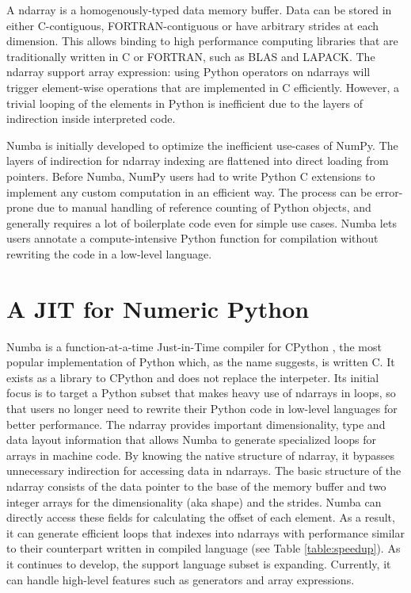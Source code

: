 \documentclass{acm_proc_article-sp}
\begin{document}
A ndarray is a homogenously-typed data memory buffer.  Data can be
stored in either C-contiguous, FORTRAN-contiguous or have arbitrary
strides at each dimension.  This allows binding to high performance
computing libraries that are traditionally written in C or FORTRAN,
such as BLAS and LAPACK. The ndarray support array expression: using
Python operators on ndarrays will trigger element-wise operations that
are implemented in C efficiently.  However, a trivial looping of the
elements in Python is inefficient due to the layers of indirection
inside interpreted code.

Numba \cite{numba:numba} is initially developed to optimize the inefficient
use-cases of NumPy.
The layers of indirection for ndarray indexing are flattened into direct
loading from pointers.  Before Numba, NumPy users had to write Python
C extensions to implement any custom computation in an efficient way.
The process can be error-prone due to manual handling of reference counting
of Python objects, and generally requires a lot of boilerplate code even
for simple use cases.  Numba lets users annotate a compute-intensive Python
function for compilation without rewriting the code in a low-level language.

\section{A JIT for Numeric Python}

Numba is a function-at-a-time Just-in-Time compiler for CPython
\cite{projectlink:cpython}, the most popular implementation of Python which,
as the name suggests, is written C.
It exists as a library to CPython and does not replace the interpeter.
Its initial focus is to target a Python subset that makes heavy use of
ndarrays in loops, so that users no longer need to rewrite their Python code in
low-level languages for better performance.
The ndarray provides important dimensionality, type and data layout information
that allows Numba to generate specialized  loops for arrays in machine code.
By knowing the native structure of ndarray,
it bypasses unnecessary indirection for accessing data in ndarrays.
The basic structure of the ndarray consists of the data pointer to the base of
the memory buffer and two integer arrays for the dimensionality (aka shape) and
the strides. Numba can directly access these fields for calculating the offset
of each element.  As a result, it can generate efficient loops that indexes
into ndarrays with performance similar to their counterpart written in compiled
language (see Table \ref{table:speedup}). As it continues to develop, the support language
subset is expanding. Currently, it can handle high-level features such as
generators and array expressions.
\end{document}
